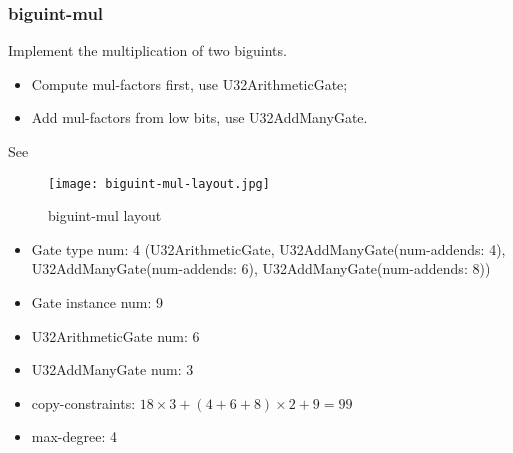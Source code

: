 \subsubsection{biguint-mul}

Implement the multiplication of two biguints.

\begin{itemize}
    \item Compute mul-factors first, use U32ArithmeticGate;
    \item Add mul-factors from low bits, use U32AddManyGate.
\end{itemize}

See 
\begin{figure}[!ht]
    \centering
    \texttt{[image: biguint-mul-layout.jpg]}
    \caption{biguint-mul layout}
    \label{fig:biguint-mul-layout}
\end{figure}

\begin{itemize}
    \item Gate type num: 4 (U32ArithmeticGate, U32AddManyGate(num-addends: 4), U32AddManyGate(num-addends: 6), U32AddManyGate(num-addends: 8))
    \item Gate instance num: 9
    \item U32ArithmeticGate num: 6
    \item U32AddManyGate num: 3
    \item copy-constraints: $18 \times 3 + (4 + 6 + 8) \times 2 + 9 = 99$
    \item max-degree: 4
\end{itemize}
